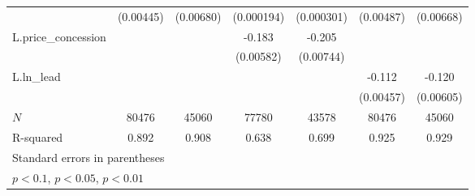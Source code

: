 {\begin{tabular}{l*{6}{c}}
            &   (0.00445)         &   (0.00680)         &  (0.000194)         &  (0.000301)         &   (0.00487)         &   (0.00668)         \\
\addlinespace
L.price\_concession&                     &                     &      -0.183\sym{***}&      -0.205\sym{***}&                     &                     \\
            &                     &                     &   (0.00582)         &   (0.00744)         &                     &                     \\
\addlinespace
L.ln\_lead   &                     &                     &                     &                     &      -0.112\sym{***}&      -0.120\sym{***}\\
            &                     &                     &                     &                     &   (0.00457)         &   (0.00605)         \\
\midrule
\(N\)       &       80476         &       45060         &       77780         &       43578         &       80476         &       45060         \\
R-squared   &       0.892         &       0.908         &       0.638         &       0.699         &       0.925         &       0.929         \\
\bottomrule
\multicolumn{7}{l}{\footnotesize Standard errors in parentheses}\\
\multicolumn{7}{l}{\footnotesize \sym{*} \(p<0.1\), \sym{**} \(p<0.05\), \sym{***} \(p<0.01\)}\\
\end{tabular}
}
